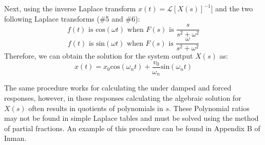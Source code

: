\documentclass[12pt,letter]{article}
\numberwithin{ex}{section} %
\numberwithin{re}{section} %
\newcommand{\Laplace}[1]{\ensuremath{\mathcal{L}{\left[#1\right]}}}
\begin{document}
			Next, using the inverse Laplace transform $x(t) = \Laplace{X(s)}^{-1}]$ and the two following Laplace transforms (\#5 and \#6):
			\begin{equation}
			f(t) \text{ is cos}(\omega t) \text{ when }  F(s) \text{ is } \frac{s}{s^2+\omega^2} 
			\end{equation}
			\begin{equation}
			f(t) \text{ is sin}(\omega t)  \text{ when }  F(s) \text{ is } \frac{\omega}{s^2+\omega^2} 
			\end{equation}
			Therefore, we can obtain the solution for the system output $X(s)$ as:
			\begin{equation}
			x(t) = x_0 \text{cos}(\omega_n t) + \frac{v_0}{\omega_n}\text{sin}(\omega_n t)
			\end{equation}
			
			The same procedure works for calculating the under damped and forced responses, however, in these responses calculating the algebraic solution for $X(s)$ often results in quotients of polynomials in $s$. These Polynomial ratios may not be found in simple Laplace tables and must be solved using the method of partial fractions. An example of this procedure can be found in Appendix B of Inman. 
\end{document}
